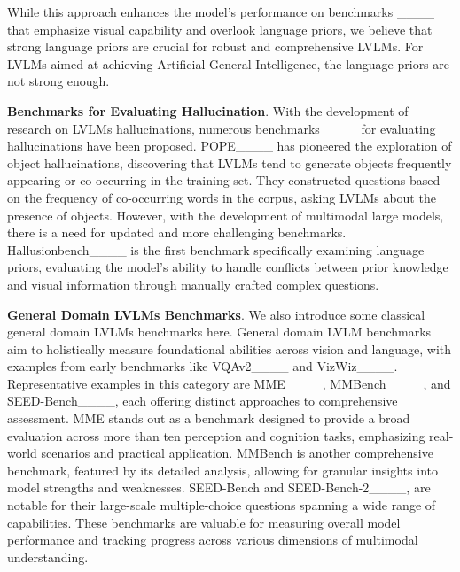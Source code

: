 While this approach enhances the model's performance on benchmarks ____ that emphasize visual capability and overlook language priors, we believe that strong language priors are crucial for robust and comprehensive LVLMs. For LVLMs aimed at achieving Artificial General Intelligence, the language priors are not strong enough.

\noindent\textbf{Benchmarks for Evaluating Hallucination}. With the development of research on LVLMs hallucinations, numerous benchmarks____ for evaluating hallucinations have been proposed. POPE____ has pioneered the exploration of object hallucinations, discovering that LVLMs tend to generate objects frequently appearing or co-occurring in the training set. They constructed questions based on the frequency of co-occurring words in the corpus, asking LVLMs about the presence of objects. However, with the development of multimodal large models, there is a need for updated and more challenging benchmarks. Hallusionbench____ is the first benchmark specifically examining language priors, evaluating the model's ability to handle conflicts between prior knowledge and visual information through manually crafted complex questions.

\noindent\textbf{General Domain LVLMs Benchmarks}. We also introduce some classical general domain LVLMs benchmarks here. General domain LVLM benchmarks aim to holistically measure foundational abilities across vision and language, with examples from early benchmarks like VQAv2____ and VizWiz____. Representative examples in this category are MME____, MMBench____, and SEED-Bench____, each offering distinct approaches to comprehensive assessment. MME stands out as a benchmark designed to provide a broad evaluation across more than ten perception and cognition tasks, emphasizing real-world scenarios and practical application. MMBench is another comprehensive benchmark, featured by its detailed analysis, allowing for granular insights into model strengths and weaknesses. SEED-Bench and SEED-Bench-2____, are notable for their large-scale multiple-choice questions spanning a wide range of capabilities. These benchmarks are valuable for measuring overall model performance and tracking progress across various dimensions of multimodal understanding.